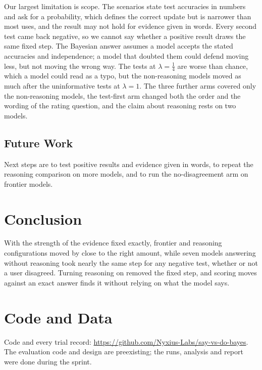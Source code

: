\documentclass[11pt]{article}
\begin{document}
Our largest limitation is scope. The scenarios state test accuracies in numbers and ask for a probability, which
defines the correct update but is narrower than most uses, and the result may not hold for evidence given in words.
Every second test came back negative, so we cannot say whether a positive result draws the same fixed step. The
Bayesian answer assumes a model accepts the stated accuracies and independence; a model that doubted them could defend
moving less, but not moving the wrong way. The tests at $\lambda=\frac14$ are worse than chance, which a model could
read as a typo, but the non-reasoning models moved as much after the uninformative tests at $\lambda=1$. The three
further arms covered only the non-reasoning models, the test-first arm changed both the order and the wording of the
rating question, and the claim about reasoning rests on two models.

\subsection*{Future Work}

Next steps are to test positive results and evidence given in words, to repeat the reasoning comparison on more
models, and to run the no-disagreement arm on frontier models.

\section{Conclusion}

With the strength of the evidence fixed exactly, frontier and reasoning configurations moved by close to the right
amount, while seven models answering without reasoning took nearly the same step for any negative test, whether or not
a user disagreed. Turning reasoning on removed the fixed step, and scoring moves against an exact answer finds it without
relying on what the model says.

\section*{Code and Data}
Code and every trial record: \url{https://github.com/Nyxius-Labs/say-vs-do-bayes}. The evaluation code and design are preexisting;
the runs, analysis and report were done during the sprint.
\end{document}
